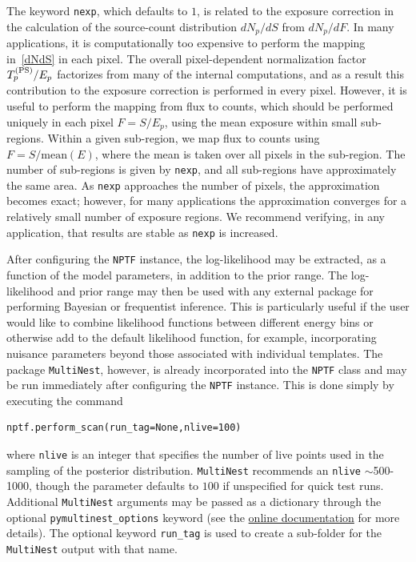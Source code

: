 The keyword \lstinline{nexp}, which defaults to $1$, is related to the exposure correction in the calculation of the source-count distribution $dN_p/dS$ from $dN_p/dF$.  In many applications, it is computationally too expensive to perform the mapping in~\eqref{dNdS} in each pixel.  The overall pixel-dependent normalization factor $T_p^{({\rm PS})} / E_p$ factorizes from many of the internal computations, and as a result this contribution to the exposure correction is performed in every pixel.  However, it is useful to perform the mapping from flux to counts, which should be performed uniquely in each pixel $F = S / E_p$, using the mean exposure within small sub-regions.  Within a given sub-region, we map flux to counts using $F = S / \text{mean}(E)$, where the mean is taken over all pixels in the sub-region.  The number of sub-regions is given by \lstinline{nexp}, and all sub-regions have approximately the same area.  As \lstinline{nexp} approaches the number of pixels, the approximation becomes exact; however, for many applications the approximation converges for a relatively small number of exposure regions.  We recommend verifying, in any application, that results are stable as \lstinline{nexp} is increased.        

After configuring the \lstinline{NPTF} instance, the log-likelihood may be extracted, as a function of the model parameters, in addition to the prior range.  The log-likelihood and prior range may then be used with any external package for performing Bayesian or frequentist inference.  This is particularly useful if the user would like to combine likelihood functions between different energy bins or otherwise add to the default likelihood function, for example, incorporating nuisance parameters beyond those associated with individual templates.   The package \texttt{MultiNest}, however, is already incorporated into the \lstinline{NPTF} class and may be run immediately after configuring the \lstinline{NPTF} instance.  This is done simply by executing the command
\begin{lstlisting}
nptf.perform_scan(run_tag=None,nlive=100)
\end{lstlisting}
where \lstinline{nlive} is an integer that specifies the number of live points used in the sampling of the posterior distribution.  \texttt{MultiNest} recommends an \lstinline{nlive} $\sim$500-1000, though the parameter defaults to $100$ if unspecified for quick test runs.  Additional \texttt{MultiNest} arguments may be passed as a dictionary through the optional \lstinline{pymultinest_options} keyword (see the \href{http://nptfit.readthedocs.io}{online documentation} for more details).  The optional keyword \lstinline{run_tag} is used to create a sub-folder for the \texttt{MultiNest} output with that name.

